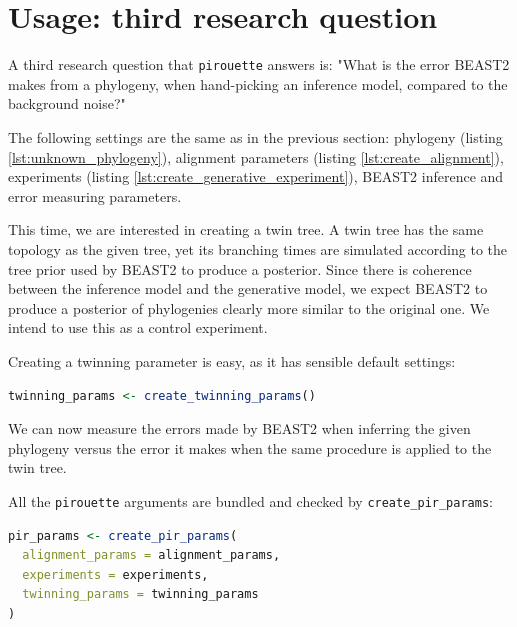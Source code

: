 \documentclass{article}
\newcommand{\richel}[1]{\textcolor{orange}{\textbf{[RB: #1]}}}
\begin{document}
\section{Usage: third research question}

A third research question that \verb;pirouette; answers is:
"What is the error BEAST2 makes from a phylogeny, 
when hand-picking an inference model, compared to the background noise?"

The following settings are the same as in the previous section:
phylogeny (listing \ref{lst:unknown_phylogeny}), 
alignment parameters (listing \ref{lst:create_alignment}), 
experiments (listing \ref{lst:create_generative_experiment}),
BEAST2 inference and error measuring parameters.

This time, we are interested in creating a twin tree. A twin tree
has the same topology as the given tree, 
yet its branching times are simulated according 
to the tree prior used by BEAST2 to produce a posterior. 
Since there is coherence between the inference model and the generative model, 
we expect BEAST2 to produce a posterior of phylogenies clearly 
more similar to the original one. 
We intend to use this as a control experiment.

Creating a twinning parameter is easy, as it has sensible default settings:

\begin{lstlisting}[language=R, floatplacement=H, frame=single]
twinning_params <- create_twinning_params()
\end{lstlisting}

We can now measure the errors made by BEAST2 when inferring the given phylogeny versus the error it makes when the same procedure is applied to the twin tree.

All the \verb;pirouette; arguments are bundled and checked by \verb;create_pir_params;:

\begin{lstlisting}[language=R, floatplacement=H, frame=single]
pir_params <- create_pir_params(
  alignment_params = alignment_params,
  experiments = experiments,
  twinning_params = twinning_params
)
\end{lstlisting}
\end{document}
